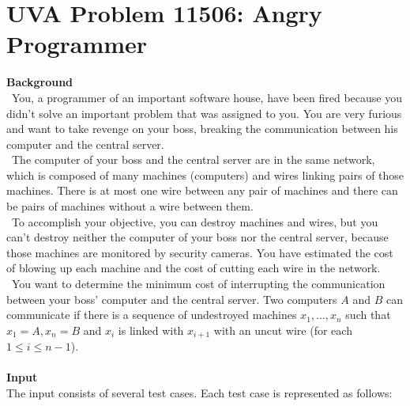 \documentclass[12pt]{article}
\begin{document}
\section{UVA Problem 11506: Angry Programmer}
\textbf{Background} \\
~\indent You, a programmer of an important software house, have been fired because you
didn't solve an important problem that was assigned to you. You are very furious
and want to take revenge on your boss, breaking the communication between his
computer
and the central server. \\
~\indent The computer of your boss and the central server are in the same network, which
is composed of many machines (computers) and wires linking pairs of those machines.
There is at most one wire between any pair of machines and there can be pairs of
machines without a wire between them. \\
~\indent To accomplish your objective, you can destroy machines and wires, but you can't
destroy neither the computer of your boss nor the central server, because those machines
are monitored by security cameras. You have estimated the cost of blowing up
each machine and the cost of cutting each wire in the network. \\
~\indent You want to determine the minimum cost of interrupting the communication between
your boss' computer and the central server. Two computers $A$ and $B$ can
communicate if there is a sequence of undestroyed machines $x_1,...,x_n$ such that
$x_1 = A, x_n = B$ and $x_i$ is linked with $x_{i+1}$ with an uncut wire (for each $1 \leq i \leq n - 1$). \\ \\
\textbf{Input} \\
The input consists of several test cases. Each test case is represented as follows:
\end{document}
